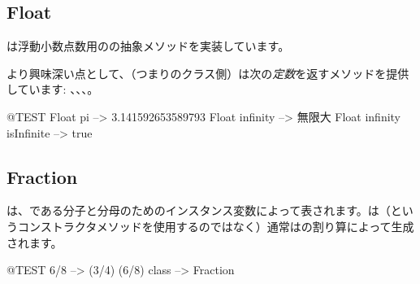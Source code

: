 \documentclass[a4paper,10pt,twoside]{book}
\begin{document}

\subsection{Float}

は浮動小数点数用のの抽象メソッドを実装しています。

より興味深い点として、（\ie つまりのクラス側）は次の\emph{定数}を返すメソッドを提供しています: 、、、。

\begin{code}{@TEST}
Float pi                      --> 3.141592653589793
Float infinity               --> 無限大
Float infinity isInfinite --> true
\end{code}

\subsection{Fraction}

は、である分子と分母のためのインスタンス変数によって表されます。は（というコンストラクタメソッドを使用するのではなく）通常はの割り算によって生成されます。

\begin{code}{@TEST}
6/8             --> (3/4)
(6/8) class --> Fraction
\end{code}
\end{document}
